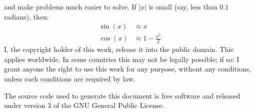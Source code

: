 \documentclass{article}
\theoremstyle{normal}
\theoremstyle{plain}
\begin{document}
    and make problems much easier to solve. If $|x|$ is small (say, less than
    $0.1$ radians), then:
    \begin{align}
        \sin(x)&\approx{x}\\
        \cos(x)&\approx{1}-\frac{x^{2}}{2}
    \end{align}
    \newpage
    I, the copyright holder of this work, release it into the public domain.
    This applies worldwide. In some countries this may not be legally possible;
    if so: I grant anyone the right to use this work for any purpose, without
    any conditions, unless such conditions are required by law.
    \par\hfill\par
    The source code used to generate this document is free software and released
    under version 3 of the GNU General Public License.
\end{document}

